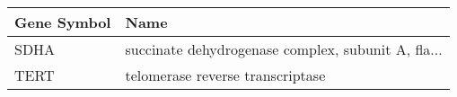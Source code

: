 \begin{tabular}{ll}
\toprule
Gene Symbol &                                               Name \\
\midrule
       SDHA & succinate dehydrogenase complex, subunit A, fla... \\
       TERT &                   telomerase reverse transcriptase \\
\bottomrule
\end{tabular}
